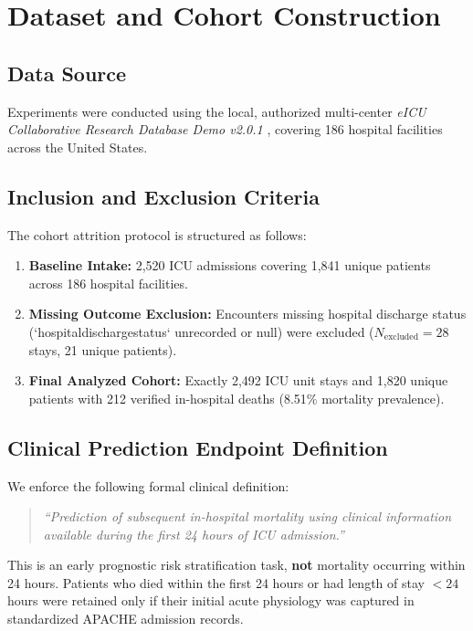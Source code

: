 \documentclass[conference]{IEEEtran}
\begin{document}
\section{Dataset and Cohort Construction}
\subsection{Data Source}
Experiments were conducted using the local, authorized multi-center \textit{eICU Collaborative Research Database Demo v2.0.1} \cite{pollard2018eicu}, covering 186 hospital facilities across the United States.

\subsection{Inclusion and Exclusion Criteria}
The cohort attrition protocol is structured as follows:
\begin{enumerate}
    \item \textbf{Baseline Intake:} 2,520 ICU admissions covering 1,841 unique patients across 186 hospital facilities.
    \item \textbf{Missing Outcome Exclusion:} Encounters missing hospital discharge status (`hospitaldischargestatus` unrecorded or null) were excluded ($N_{\text{excluded}} = 28$ stays, 21 unique patients).
    \item \textbf{Final Analyzed Cohort:} Exactly 2,492 ICU unit stays and 1,820 unique patients with 212 verified in-hospital deaths (8.51\% mortality prevalence).
\end{enumerate}

\subsection{Clinical Prediction Endpoint Definition}
We enforce the following formal clinical definition:
\begin{quote}
\textit{``Prediction of subsequent in-hospital mortality using clinical information available during the first 24 hours of ICU admission.''}
\end{quote}
This is an early prognostic risk stratification task, \textbf{not} mortality occurring within 24 hours. Patients who died within the first 24 hours or had length of stay $< 24$ hours were retained only if their initial acute physiology was captured in standardized APACHE admission records.
\end{document}
